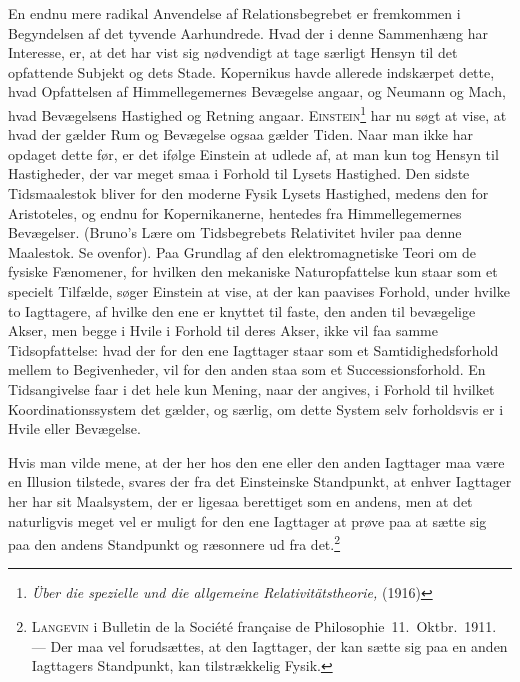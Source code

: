 \documentclass[12pt]{article}
\newcommand{\opage}[1]{\marginnote{\footnotesize\textit{[#1]}}}
\begin{document}
En endnu mere radikal Anvendelse af Relationsbegrebet er fremkommen i
Begyndelsen af det tyvende Aarhundrede. Hvad der i denne Sammenhæng har
Interesse, er, at det har vist sig nødvendigt at tage særligt Hensyn til
det opfattende Subjekt og dets Stade. Kopernikus havde allerede indskærpet
dette, hvad Opfattelsen af Himmellegemernes Bevægelse angaar, og Neumann
og Mach, hvad Bevægelsens Hastighed og Retning angaar.
\textsc{Einstein}\footnote{\textit{Über die spezielle und die allgemeine
  Relativitätstheorie,} (1916)}
har nu søgt at vise, at hvad der gælder Rum og Bevægelse ogsaa gælder
Tiden. Naar man ikke har opdaget dette før, er det ifølge Einstein at
udlede af, at man kun tog Hensyn til Hastigheder, der var meget smaa i
Forhold til Lysets Hastighed. Den sidste Tidsmaalestok bliver for den
moderne Fysik Lysets Hastighed, medens den for Aristoteles, og endnu for
Kopernikanerne, hentedes fra Himmellegemernes
\opage{74} \setcounter{footnote}{0}%
Bevægelser. (Bruno's Lære
om Tidsbegrebets Relativitet hviler paa denne Maalestok. Se ovenfor). Paa
Grundlag af den elektromagnetiske Teori om de fysiske Fænomener, for
hvilken den mekaniske Naturopfattelse kun staar som et specielt Tilfælde,
søger Einstein at vise, at der kan paavises Forhold, under hvilke to
Iagttagere, af hvilke den ene er knyttet til faste, den anden til
bevægelige Akser, men begge i Hvile i Forhold til deres Akser, ikke vil
faa samme Tidsopfattelse: hvad der for den ene Iagttager staar som et
Samtidighedsforhold mellem to Begivenheder, vil for den anden staa som et
Successionsforhold. En Tidsangivelse faar i det hele kun Mening, naar der
angives, i Forhold til hvilket Koordinationssystem det gælder, og særlig,
om dette System selv forholdsvis er i Hvile eller Bevægelse.

Hvis man vilde mene, at der her hos den ene eller den anden Iagttager maa
være en Illusion tilstede, svares der fra det Einsteinske Standpunkt, at
enhver Iagttager her har sit Maalsystem, der er ligesaa berettiget som en
andens, men at det naturligvis meget vel er muligt for den ene Iagttager
at prøve paa at sætte sig paa den andens Standpunkt og ræsonnere ud fra
det.\footnote{\textsc{Langevin} i \guillemotright Bulletin de la Société
  française de Philosophie\guillemotleft\ 11.\ Oktbr.\ 1911. --- Der maa vel
  forudsættes, at den Iagttager, der kan sætte sig paa en anden Iagttagers
  Standpunkt, kan tilstrækkelig Fysik.}
\end{document}
